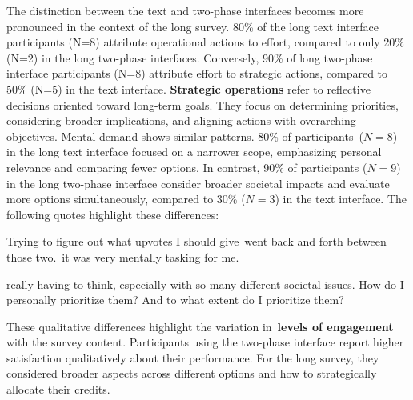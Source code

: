 The distinction between the text and two-phase interfaces becomes more pronounced in the context of the long survey. 80\% of the long text interface participants (N=8) attribute operational actions to effort, compared to only 20\% (N=2) in the long two-phase interfaces. Conversely, 90\% of long two-phase interface participants (N=8) attribute effort to strategic actions, compared to 50\% (N=5) in the text interface. \textbf{Strategic operations} refer to reflective decisions oriented toward long-term goals. They focus on determining priorities, considering broader implications, and aligning actions with overarching objectives. Mental demand shows similar patterns. 80\% of participants~($N=8$) in the long text interface focused on a narrower scope, emphasizing personal relevance and comparing fewer options. In contrast, 90\% of participants ($N=9$) in the long two-phase interface consider broader societal impacts and evaluate more options simultaneously, compared to 30\% ($N=3$) in the text interface. The following quotes highlight these differences:

\begin{displayquote}
Trying to figure out what upvotes I should give~\bracketellipsis went back and forth between those two.~\bracketellipsis it was very mentally tasking for me. \hfill{}
\end{displayquote}

\begin{displayquote}
\bracketellipsis really having to think, especially with so many different societal issues. How do I personally prioritize them? And to what extent do I prioritize them? \hfill{}
\end{displayquote}

These qualitative differences highlight the variation in~\textbf{levels of engagement} with the survey content. Participants using the two-phase interface report higher satisfaction qualitatively about their performance. For the long survey, they considered broader aspects across different options and how to strategically allocate their credits. 




